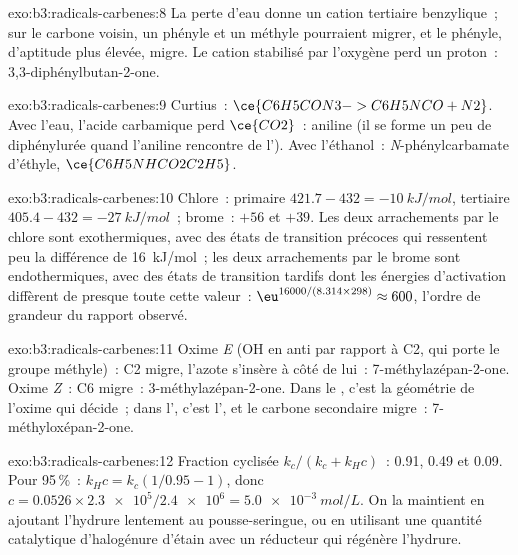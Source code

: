 \begin{solution}{exo:b3:radicals-carbenes:8}
La perte d'eau donne un cation tertiaire benzylique~; sur le carbone voisin,
un phényle et un méthyle pourraient migrer, et le phényle, d'aptitude plus
élevée, migre. Le cation stabilisé par l'oxygène perd un proton~:
3,3-diphénylbutan-2-one.
\end{solution}

\begin{solution}{exo:b3:radicals-carbenes:9}
Curtius~: $\ce{C6H5CON3 -> C6H5NCO + N2}$. Avec l'eau, l'acide carbamique perd $\ce{CO2}$~: aniline
(il se forme un peu de diphénylurée quand l'aniline rencontre de
l'). Avec l'éthanol~: \textit{N}-phénylcarbamate d'éthyle, $\ce{C6H5NHCO2C2H5}$.
\end{solution}

\begin{solution}{exo:b3:radicals-carbenes:10}
Chlore~: primaire $421.7 - 432 = \qty{-10}{kJ/mol}$, tertiaire $405.4 - 432 = \qty{-27}{kJ/mol}$~; brome~: $+56$ et
$+39$. Les deux arrachements par le chlore sont exothermiques, avec des
états de transition précoces qui ressentent peu la différence de
\qty{16}{kJ/mol}~; les deux arrachements par le brome sont endothermiques,
avec des états de transition tardifs dont les énergies d'activation
diffèrent de presque toute cette valeur~:
$\eu^{16000/(8.314 \times 298)} \approx 600$, l'ordre de grandeur du rapport observé.
\end{solution}

\begin{solution}{exo:b3:radicals-carbenes:11}
Oxime \textit{E} (OH en anti par rapport à C2, qui porte le groupe méthyle)~: C2 migre, l'azote s'insère
à côté de lui~: 7-méthylazépan-2-one. Oxime \textit{Z}~: C6 migre~: 3-méthylazépan-2-one. Dans le
, c'est la géométrie de l'oxime qui décide~; dans
l', c'est l', et le carbone
secondaire migre~: 7-méthyloxépan-2-one.
\end{solution}

\begin{solution}{exo:b3:radicals-carbenes:12}
Fraction cyclisée $k_c/(k_c + k_H c)$~: 0.91, 0.49 et 0.09. Pour 95\,\%~: $k_Hc = k_c(1/0.95 - 1)$, donc
$c = 0.0526 \times \num{2.3e5}/\num{2.4e6} = \qty{5.0e-3}{mol/L}$. On la maintient en ajoutant l'hydrure lentement au
pousse-seringue, ou en utilisant une quantité catalytique d'halogénure
d'étain avec un réducteur qui régénère l'hydrure.
\end{solution}

